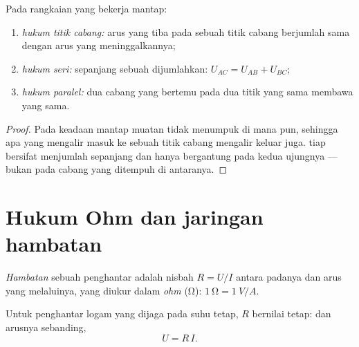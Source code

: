 \begin{proposition}\label{prop:g11:circuits-and-power:laws}
Pada rangkaian yang bekerja mantap:
\begin{enumerate}
  \item \emph{hukum titik cabang:} arus yang tiba pada sebuah titik
        cabang berjumlah sama dengan arus yang meninggalkannya;
  \item \emph{hukum seri:}  sepanjang sebuah 
        dijumlahkan: $U_{AC} = U_{AB} + U_{BC}$;
  \item \emph{hukum paralel:} dua cabang yang bertemu pada dua titik
        yang sama membawa  yang sama.
\end{enumerate}
\end{proposition}

\begin{proof}
Pada keadaan mantap muatan tidak menumpuk di mana pun, sehingga apa yang
mengalir masuk ke sebuah titik cabang mengalir keluar juga.  tiap
 bersifat menjumlah sepanjang  dan hanya bergantung pada
kedua ujungnya --- bukan pada cabang yang ditempuh di antaranya.
\end{proof}

\section{Hukum Ohm dan jaringan hambatan}

\begin{definition}[Hambatan]\label{def:g11:circuits-and-power:resistance}
\emph{Hambatan} sebuah penghantar adalah nisbah
$R = U/I$ antara  padanya dan arus yang melaluinya, yang diukur
dalam \emph{ohm} (\unit{\ohm}): $\qty{1}{\ohm} = \qty{1}{V/A}$.
\end{definition}

\begin{proposition}\label{prop:g11:circuits-and-power:ohm}
Untuk penghantar logam yang dijaga pada suhu tetap, $R$ bernilai tetap:
 dan arusnya sebanding,
\[ U = R\,I . \]
\end{proposition}
\admitted

